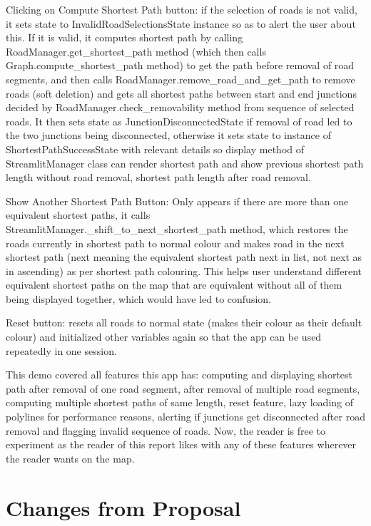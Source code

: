 \documentclass[fontsize=11pt]{article}
\begin{document}
Clicking on Compute Shortest Path button: if the selection of roads is not valid, it sets state to InvalidRoadSelectionsState instance so as to alert the user about this. If it is valid, it computes shortest path by calling RoadManager.get\_shortest\_path method (which then calls Graph.compute\_shortest\_path method) to get the path before removal of road segments, and then calls RoadManager.remove\_road\_and\_get\_path to remove roads (soft deletion) and gets all shortest paths between start and end junctions decided by RoadManager.check\_removability method from sequence of selected roads.  It then sets state as 
JunctionDisconnectedState if removal of road led to the two junctions being disconnected, otherwise it sets state to instance of ShortestPathSuccessState with relevant details so display method of StreamlitManager class can render shortest path and show previous shortest path length without road removal, shortest path length after road removal.

Show Another Shortest Path Button: Only appears if there are more than one equivalent shortest paths, it calls StreamlitManager.\_shift\_to\_next\_shortest\_path method, which restores the roads currently in shortest path to normal colour and makes road in the next shortest path (next meaning the equivalent shortest path next in list, not next as in ascending) as per shortest path colouring. This helps user understand different equivalent shortest paths on the map that are equivalent without all of them being displayed together, which would have led to confusion.

Reset button: resets all roads to normal state (makes their colour as their default colour) and initialized other variables again so that the app can be used repeatedly in one session.

This demo covered all features this app has: computing and displaying shortest path after removal of one road segment, after removal of multiple road segments, computing multiple shortest paths of same length, reset feature, lazy loading of polylines for performance reasons, alerting if junctions get disconnected after road removal and flagging invalid sequence of roads. Now, the reader is free to experiment as the reader of this report likes with any of these features wherever the reader wants on the map.

\section*{Changes from Proposal}
\end{document}
